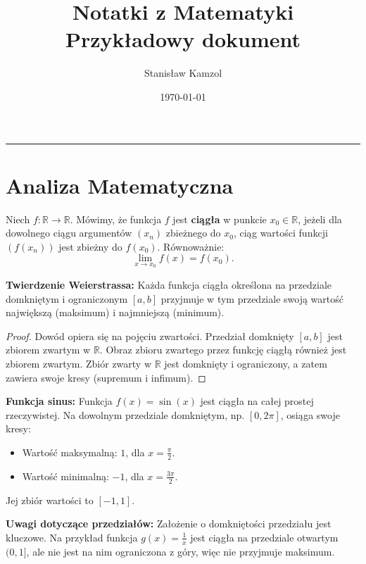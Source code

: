 \documentclass[12pt,a4paper]{article}
\title{\Huge\bfseries Notatki z Matematyki\\[1ex]\large\color{ctpLatteSubtext} Przykładowy dokument}
\author{\large Stanisław Kamzol}
\date{\today}
\begin{document}
\color{ctpLatteText}

\maketitle
\hrule height 1.2pt
\vspace{1.5em}
\tableofcontents
\newpage

\section{Analiza Matematyczna}

\begin{Defi}
Niech $f: \mathbb{R} \to \mathbb{R}$. Mówimy, że funkcja $f$ jest \textbf{ciągła} w punkcie $x_0 \in \mathbb{R}$, jeżeli dla dowolnego ciągu argumentów $(x_n)$ zbieżnego do $x_0$, ciąg wartości funkcji $(f(x_n))$ jest zbieżny do $f(x_0)$. Równoważnie:
\[
 \lim_{x \to x_0} f(x) = f(x_0).
\]
\end{Defi}

\begin{Tw}
\textbf{Twierdzenie Weierstrassa:} Każda funkcja ciągła określona na przedziale domkniętym i ograniczonym $[a,b]$ przyjmuje w tym przedziale swoją wartość największą (maksimum) i najmniejszą (minimum).
\end{Tw}

\begin{proof}
Dowód opiera się na pojęciu zwartości. Przedział domknięty $[a,b]$ jest zbiorem zwartym w $\mathbb{R}$. Obraz zbioru zwartego przez funkcję ciągłą również jest zbiorem zwartym. Zbiór zwarty w $\mathbb{R}$ jest domknięty i ograniczony, a zatem zawiera swoje kresy (supremum i infimum).
\end{proof}

\begin{Prz}
\textbf{Funkcja sinus:} Funkcja $f(x)=\sin(x)$ jest ciągła na całej prostej rzeczywistej. Na dowolnym przedziale domkniętym, np. $[0, 2\pi]$, osiąga swoje kresy:
\begin{itemize}
    \item Wartość maksymalną: $1$, dla $x = \frac{\pi}{2}$.
    \item Wartość minimalną: $-1$, dla $x = \frac{3\pi}{2}$.
\end{itemize}
Jej zbiór wartości to $[-1,1]$.
\end{Prz}

\begin{Uw}
\textbf{Uwagi dotyczące przedziałów:} Założenie o domkniętości przedziału jest kluczowe. Na przykład funkcja $g(x) = \frac{1}{x}$ jest ciągła na przedziale otwartym $(0,1]$, ale nie jest na nim ograniczona z góry, więc nie przyjmuje maksimum.
\end{Uw}
\end{document}
